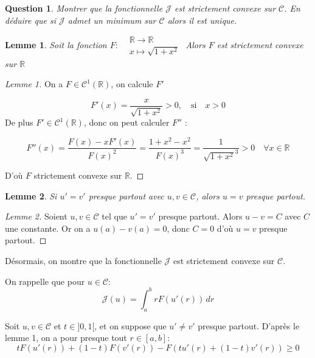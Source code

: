 \documentclass{article}
\newcommand{\Real}{ \mathbb{R} }
\newcommand{\FunctionClass}[2]{ \mathcal{C}^{#1} \left( #2 \right) }
\newcommand{\FunctionWithSqrt}[1]{ \sqrt{1 + #1 ^2} }
\newcommand{\Integral}[4]{ \int_{#1}^{#2} #3 \, d#4 }
\newtheorem{question}{Question}[subsection]
\newenvironment{answer}
  {\color{blue}}
  {}
\newcommand{\QuestionAnswer}[2]{
    \begin{question}
        #1
    \end{question}
    \begin{answer}
        #2
    \end{answer}
}
\newtheorem{lemma}{Lemme}
\newtheorem{proof}{Preuve}
\newcommand{\SetC}{\mathcal{C}}
\newcommand{\FunctionJ}{\mathcal{J}}
\begin{document}
\QuestionAnswer{
    Montrer que la fonctionnelle $\FunctionJ$ est strictement convexe sur $\SetC$. En déduire que si $\FunctionJ$ admet un minimum sur $\SetC$ alors il est unique.
}{
    \begin{lemma}
        Soit la fonction $F:
    \begin{aligned}
        & \Real \longrightarrow \Real \\
        & x \longmapsto \FunctionWithSqrt{x}
    \end{aligned}$\newline
    Alors $F$ est strictement convexe sur $\Real$
    \end{lemma}

    \begin{proof}[Lemme 1]
        On a $F \in \FunctionClass{1}{\Real}$, on calcule $F'$

        $$F'(x) = \frac{x}{\FunctionWithSqrt{x}} > 0, \quad \text{si} \quad x > 0$$
        De plus $F' \in \FunctionClass{1}{\Real}$, donc on peut calculer $F''$ :

        $$F''(x) = \frac{F(x) - xF'(x)}{F(x)^2} = \frac{1 + x^2 - x^2 }{F(x)^3} = \frac{1}{\FunctionWithSqrt{x}^3} > 0 \quad \forall x \in \Real$$

        D'où $F$ strictement convexe sur $\Real$.
    \end{proof}

    \begin{lemma}
        Si $u' = v'$ presque partout avec $u,v \in \SetC$, alors $u = v$ presque partout.
    \end{lemma}

    \begin{proof}[Lemme 2]
        Soient $u,v\in \SetC$ tel que $u'=v'$ presque partout.
        Alors $u - v = C$ avec $C$ une constante.
        Or on a $u(a) - v(a)=0$, donc $C = 0$ d'où $u = v$ presque partout.
    \end{proof}

    Désormais, on montre que la fonctionnelle $\FunctionJ$ est strictement convexe sur $\SetC$.\newline

    On rappelle que pour $u \in \SetC$:
    $$\FunctionJ(u) = \Integral{a}{b}{r F(u'(r))}{r}$$

    Soit $u,v \in \SetC$ et $t \in ]0, 1[$, et on suppose que $u' \neq v'$ presque partout. D'après le lemme 1, on a pour presque tout $r \in [a,b]$:
    $$t F(u'(r)) + (1-t) F(v'(r)) - F(t u'(r) + (1-t) v'(r)) \geq 0$$

}
\end{document}
